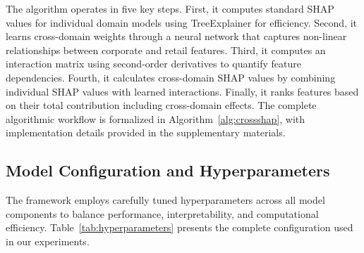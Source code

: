 \documentclass[a4paper,11pt,twoside]{article}
\newcommand{\0}{\Bf{0}}
\theoremstyle{definition}
\begin{document}
The algorithm operates in five key steps. First, it computes standard SHAP values for individual domain models using TreeExplainer for efficiency. Second, it learns cross-domain weights through a neural network that captures non-linear relationships between corporate and retail features. Third, it computes an interaction matrix using second-order derivatives to quantify feature dependencies. Fourth, it calculates cross-domain SHAP values by combining individual SHAP values with learned interactions. Finally, it ranks features based on their total contribution including cross-domain effects. The complete algorithmic workflow is formalized in Algorithm~\ref{alg:crossshap}, with implementation details provided in the supplementary materials.

\subsection{Model Configuration and Hyperparameters}

The framework employs carefully tuned hyperparameters across all model components to balance performance, interpretability, and computational efficiency. Table~\ref{tab:hyperparameters} presents the complete configuration used in our experiments.
\end{document}
